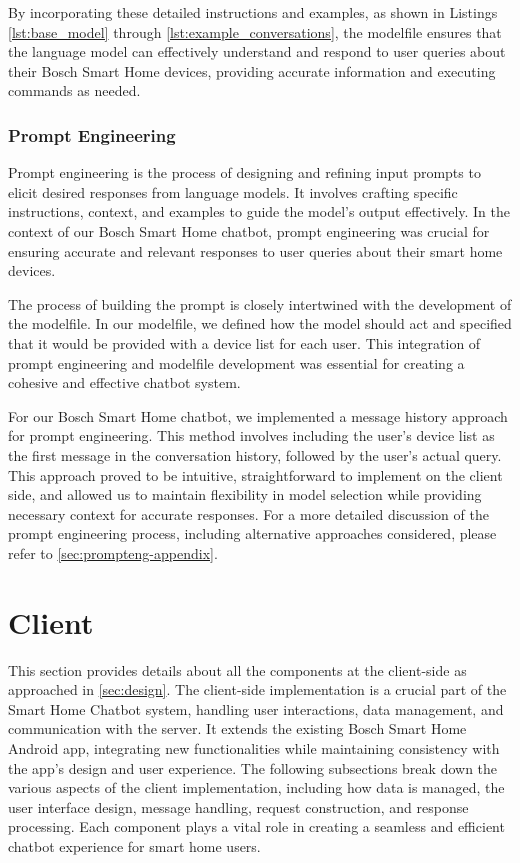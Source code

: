 By incorporating these detailed instructions and examples, as shown in Listings \ref{lst:base_model} through \ref{lst:example_conversations}, the modelfile ensures that the language model can effectively understand and respond to user queries about their Bosch Smart Home devices, providing accurate information and executing commands as needed.


\subsubsection{Prompt Engineering}

Prompt engineering is the process of designing and refining input prompts to elicit desired responses from language models. It involves crafting specific instructions, context, and examples to guide the model's output effectively. In the context of our Bosch Smart Home chatbot, prompt engineering was crucial for ensuring accurate and relevant responses to user queries about their smart home devices.

The process of building the prompt is closely intertwined with the development of the modelfile. In our modelfile, we defined how the model should act and specified that it would be provided with a device list for each user. This integration of prompt engineering and modelfile development was essential for creating a cohesive and effective chatbot system.

For our Bosch Smart Home chatbot, we implemented a message history approach for prompt engineering. This method involves including the user's device list as the first message in the conversation history, followed by the user's actual query. This approach proved to be intuitive, straightforward to implement on the client side, and allowed us to maintain flexibility in model selection while providing necessary context for accurate responses.
For a more detailed discussion of the prompt engineering process, including alternative approaches considered, please refer to \cref{sec:prompteng-appendix}.

\section{Client}
This section provides details about all the components at the client-side as approached in \cref{sec:design}. 
The client-side implementation is a crucial part of the Smart Home Chatbot system, handling user interactions, data management, and communication with the server. It extends the existing Bosch Smart Home Android app, integrating new functionalities while maintaining consistency with the app's design and user experience. 
The following subsections break down the various aspects of the client implementation, including how data is managed, the user interface design, message handling, request construction, and response processing. 
Each component plays a vital role in creating a seamless and efficient chatbot experience for smart home users.

